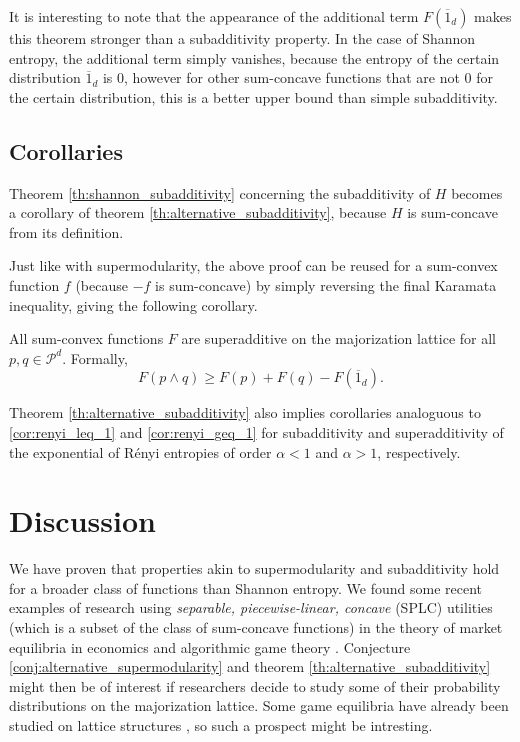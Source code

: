 It is interesting to note that the appearance of the additional term $F(\overline{1}_d)$ makes this theorem stronger than a subadditivity property. In the case of Shannon entropy, the additional term simply vanishes, because the entropy of the certain distribution $\overline{1}_d$ is 0, however for other sum-concave functions that are not 0 for the certain distribution, this is a better upper bound than simple subadditivity.



\subsection{Corollaries}

Theorem \ref{th:shannon_subadditivity} concerning the subadditivity of $H$ becomes a corollary of theorem \ref{th:alternative_subadditivity}, because $H$ is sum-concave from its definition.

Just like with supermodularity, the above proof can be reused for a sum-convex function $f$ (because $-f$ is sum-concave) by simply reversing the final Karamata inequality, giving the following corollary.

\begin{corollary} \label{cor:superadditivity_sum-convex}
    All sum-convex functions $F$ are superadditive on the majorization lattice for all $p, q \in \mathcal{P}^d$. Formally,
    \begin{equation} \label{eq:superadditivity}
        F(p \wedge q) \geq F(p) + F(q) - F(\overline{1}_d).
    \end{equation}
\end{corollary}

Theorem \ref{th:alternative_subadditivity} also implies corollaries analoguous to \ref{cor:renyi_leq_1} and \ref{cor:renyi_geq_1} for subadditivity and superadditivity of the exponential of Rényi entropies of order $\alpha < 1$ and $\alpha > 1$, respectively.



\section{Discussion}

We have proven that properties akin to supermodularity and subadditivity hold for a broader class of functions than Shannon entropy. We found some recent examples of research using \textit{separable, piecewise-linear, concave} (SPLC) utilities (which is a subset of the class of sum-concave functions) in the theory of market equilibria in economics and algorithmic game theory \cite{vazirani_market_2011, anari_nash_2017}. Conjecture \ref{conj:alternative_supermodularity} and theorem \ref{th:alternative_subadditivity} might then be of interest if researchers decide to study some of their probability distributions on the majorization lattice. Some game equilibria have already been studied on lattice structures \cite{agliardi_generalization_2000}, so such a prospect might be intresting.

